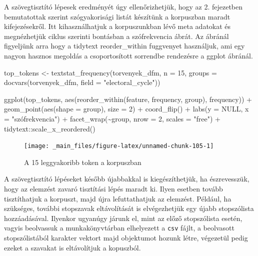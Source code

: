 \documentclass[
]{book}
\newenvironment{Shaded}{\begin{snugshade}}{\end{snugshade}}
\newcommand{\AttributeTok}[1]{\textcolor[rgb]{0.77,0.63,0.00}{#1}}
\newcommand{\ConstantTok}[1]{\textcolor[rgb]{0.00,0.00,0.00}{#1}}
\newcommand{\DecValTok}[1]{\textcolor[rgb]{0.00,0.00,0.81}{#1}}
\newcommand{\FunctionTok}[1]{\textcolor[rgb]{0.00,0.00,0.00}{#1}}
\newcommand{\NormalTok}[1]{#1}
\newcommand{\OtherTok}[1]{\textcolor[rgb]{0.56,0.35,0.01}{#1}}
\newcommand{\SpecialCharTok}[1]{\textcolor[rgb]{0.00,0.00,0.00}{#1}}
\newcommand{\StringTok}[1]{\textcolor[rgb]{0.31,0.60,0.02}{#1}}
\begin{document}
A szövegtisztító lépesek eredményét úgy ellenőrizhetjük, hogy az 2.
fejezetben bemutatottak szerint szógyakorisági listát készítünk a
korpuszban maradt kifejezésekről. Itt kihasználhatjuk a korpuszunkban
lévő meta adatokat és megnézhetjük ciklus szerinti bontásban a
szófrekvencia ábrát. Az ábránál figyeljünk arra hogy a tidytext
reorder\_within fuggvenyet használjuk, ami egy nagyon hasznos megoldás a
csoportosított sorrendbe rendezésre a ggplot ábránál.

\begin{Shaded}
\begin{Highlighting}[]


\NormalTok{top\_tokens }\OtherTok{\textless{}{-}} \FunctionTok{textstat\_frequency}\NormalTok{(torvenyek\_dfm, }\AttributeTok{n =} \DecValTok{15}\NormalTok{, }\AttributeTok{groups =} \FunctionTok{docvars}\NormalTok{(torvenyek\_dfm, }
    \AttributeTok{field =} \StringTok{"electoral\_cycle"}\NormalTok{))}

\FunctionTok{ggplot}\NormalTok{(top\_tokens, }\FunctionTok{aes}\NormalTok{(}\FunctionTok{reorder\_within}\NormalTok{(feature, frequency, group), frequency)) }\SpecialCharTok{+} \FunctionTok{geom\_point}\NormalTok{(}\FunctionTok{aes}\NormalTok{(}\AttributeTok{shape =}\NormalTok{ group), }
    \AttributeTok{size =} \DecValTok{2}\NormalTok{) }\SpecialCharTok{+} \FunctionTok{coord\_flip}\NormalTok{() }\SpecialCharTok{+} \FunctionTok{labs}\NormalTok{(}\AttributeTok{y =} \ConstantTok{NULL}\NormalTok{, }\AttributeTok{x =} \StringTok{"szófrekvencia"}\NormalTok{) }\SpecialCharTok{+} \FunctionTok{facet\_wrap}\NormalTok{(}\SpecialCharTok{\textasciitilde{}}\NormalTok{group, }
    \AttributeTok{nrow =} \DecValTok{2}\NormalTok{, }\AttributeTok{scales =} \StringTok{"free"}\NormalTok{) }\SpecialCharTok{+}\NormalTok{ tidytext}\SpecialCharTok{::}\FunctionTok{scale\_x\_reordered}\NormalTok{()}
\end{Highlighting}
\end{Shaded}

\begin{figure}

{\centering \texttt{[image: \_main\_files/figure-latex/unnamed-chunk-105-1]} 

}

\caption{A 15 leggyakoribb token a korpuszban}\label{fig:unnamed-chunk-105}
\end{figure}

A szövegtisztító lépéseket később újabbakkal is kiegészíthetjük, ha
észrevesszük, hogy az elemzést zavaró tisztítási lépés maradt ki. Ilyen
esetben tovább tisztíthatjuk a korpuszt, majd újra lefuttathatjuk az
elemzést. Például, ha szükséges, további stopszavak eltávolítását is
elvégezhetjük egy újabb stopszólista hozzáadásával. Ilyenkor ugyanúgy
járunk el, mint az előző stopszólista esetén, vagyis beolvassuk a
munkakönyvtárban elhelyezett a \texttt{csv} fájlt, a beolvasott
stopszólistából karakter vektort majd objektumot hozunk létre, végezetül
pedig ezeket a szavakat is eltávolítjuk a kopuszból.
\end{document}
